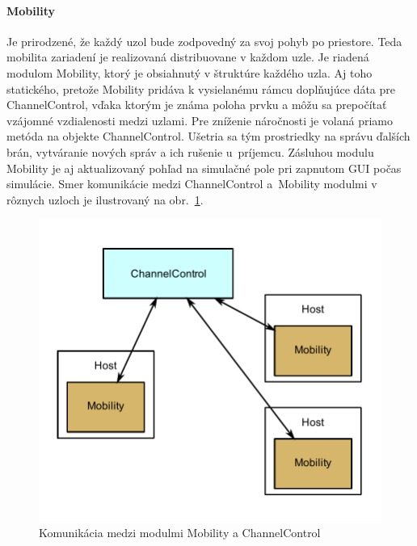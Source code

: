 \paragraph{Mobility}
\indent Je prirodzené, že každý uzol bude zodpovedný za svoj pohyb po priestore. Teda mobilita zariadení je realizovaná distribuovane v každom uzle. Je riadená modulom \ttfamily Mobility\rmfamily, ktorý je obsiahnutý v štruktúre každého uzla. Aj toho statického, pretože \ttfamily Mobility \rmfamily pridáva k vysielanému rámcu doplňujúce dáta pre \ttfamily ChannelControl\rmfamily, vďaka ktorým je známa poloha prvku a môžu sa prepočítať vzájomné vzdialenosti medzi uzlami. Pre zníženie náročnosti je volaná priamo metóda na objekte \ttfamily ChannelControl\rmfamily. Ušetria sa tým prostriedky na správu ďalších brán, vytváranie nových správ a ich rušenie u~príjemcu. Zásluhou modulu \ttfamily Mobility \rmfamily je aj aktualizovaný pohľad na simulačné pole pri zapnutom GUI počas simulácie. Smer komunikácie medzi \ttfamily ChannelControl \rmfamily a\ttfamily~Mobility \rmfamily modulmi v rôznych uzloch je ilustrovaný na obr.~\ref{fig:topology_mobility}.\\
\begin{figure}[htbp]
\begin{center}
\includegraphics[width=120mm]{figures/topology_mobility}
\caption{Komunikácia medzi modulmi \ttfamily Mobility \rmfamily a \ttfamily ChannelControl\rmfamily}
\label{fig:topology_mobility}
\end{center}
\end{figure}
